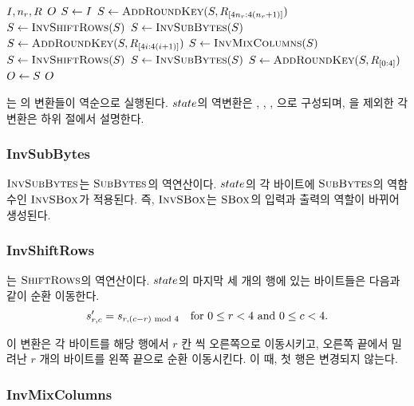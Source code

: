 \documentclass{article}
\begin{document}
\begin{algorithm}
    \caption{\invcipher}
    \begin{algorithmic}[1]
    \Require $\In, \nr, \Rk$ \Comment{$\Rk = \KE(\key)$}
    \Ensure $\Out$ 
    \State $\St \gets \In$
    \State $\St \gets \ar(\St, \Rk_{[4\nr: 4(\nr + 1)]})$
        \State $\St \gets \isr(\St)$
        \State $\St \gets \isb(\St)$
        \State $\St \gets \ar(\St, \Rk_{[4i: 4(i + 1)]})$
        \State $\St \gets \imc(\St)$
    \EndFor
    \State $\St \gets \isr(\St)$
    \State $\St \gets \isb(\St)$
    \State $\St \gets \ar(\St, \Rk_{[0:4]})$
    \State $\Out \gets \St$
    \State \Return $\Out$
    \EndProcedure
    \end{algorithmic}
\end{algorithm}

\invcipher 는 \cipher 의 변환들이 역순으로 실행된다. $\state$의 역변환은 \ar,
\isb, \isr, \imc 으로 구성되며, \ar 을 제외한 각 변환은 하위 절에서 설명한다.


\subsubsection{InvSubBytes}


$\isb$는 $\sb$의 역연산이다. $\state$의 각 바이트에 $\sb$의 역함수인 $\iSBox$가
적용된다. 즉, $\iSBox$는 $\SBox$의 입력과 출력의 역할이 바뀌어 생성된다.


\subsubsection{InvShiftRows}


\isr 는 $\sr$의 역연산이다. $\state$의 마지막 세 개의 행에 있는 바이트들은 다음과 같이 순환 이동한다.
$$
    s'_{r, c} = s_{r, (c - r) \Tmod 4} \for 0 \le r < 4 \Tand 0 \le c < 4.
$$

이 변환은 각 바이트를 해당 행에서 $r$ 칸 씩 오른쪽으로 이동시키고, 오른쪽 끝에서
밀려난 $r$ 개의 바이트를 왼쪽 끝으로 순환 이동시킨다. 이 때, 첫 행은 변경되지
않는다.


\subsubsection{InvMixColumns}
\end{document}
